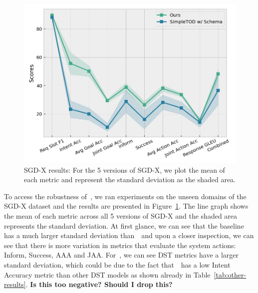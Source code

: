 \begin{figure}[t]
    \centering
    \includegraphics[width=\linewidth]{assets/sgdx_results.png}
    \caption{
        SGD-X results: For the 5 versions of SGD-X, we plot the mean of each metric and represent the standard deviation as the shaded area.
    }
    \label{fig:sgdx_graph}
\end{figure}



To access the robustness of~\oursys, we ran experiments on the unseen domains of the SGD-X dataset and the results are presented in Figure~\ref{fig:sgdx_graph}.
The line graph shows the mean of each metric across all 5 versions of SGD-X and the shaded area represents the standard deviation.
At first glance, we can see that the baseline has a much larger standard deviation than~\oursys~and upon a closer inspection, we can see that
there is more variation in metrics that evaluate the system actions: Inform, Success, AAA and JAA.
For~\oursys, we can see DST metrics have a larger standard deviation, which could be due to the fact that~\oursys~has a low Intent Accuracy metric
than other DST models as shown already in Table~\ref{tab:other-results}. \textbf{Is this too negative? Should I drop this?}




